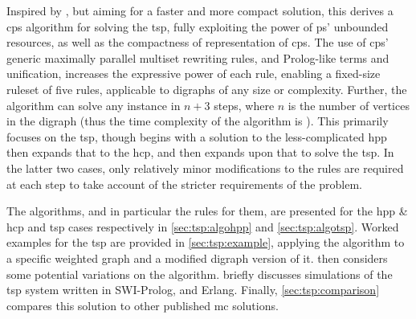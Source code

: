 Inspired by \cite{Guo2017}, but aiming for a faster and more compact solution, this  derives a \gls{cps} algorithm for solving the \gls{tsp}, fully exploiting the power of \gls{ps}' unbounded resources, as well as the compactness of representation of \gls{cps}.  The use of \gls{cps}' generic maximally parallel multiset rewriting rules, and Prolog-like terms and unification, increases the expressive power of each rule, enabling a fixed-size \gls{ruleset} of five rules, applicable to digraphs of any size or complexity.   Further, the algorithm can solve any instance in \(n + 3\) steps, where \(n\) is the number of vertices in the digraph (thus the time complexity of the algorithm is ).  This  primarily focuses on the \gls{tsp}, though begins with a solution to the less-complicated \gls{hpp} then expands that to the \gls{hcp}, and then expands upon that to solve the \gls{tsp}.  In the latter two cases, only relatively minor modifications to the rules are required at each step to take account of the stricter requirements of the problem.

The algorithms, and in particular the rules for them, are presented for the \gls{hpp} \& \gls{hcp} and \gls{tsp} cases respectively in \cref{sec:tsp:algohpp} and \cref{sec:tsp:algotsp}.  Worked examples for the \gls{tsp} are provided in \cref{sec:tsp:example}, applying the algorithm to a specific weighted graph and a modified digraph version of it.   then considers some potential variations on the algorithm.   briefly discusses simulations of the \gls{tsp} system written in SWI-Prolog, \fsharp{} and Erlang.  Finally, \cref{sec:tsp:comparison} compares this solution to other published \gls{mc} solutions.